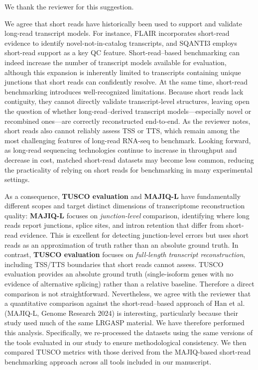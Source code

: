 \documentclass[11pt]{article}
\newcommand{\tuscoEvaluation}{TUSCO evaluation}
\newcommand{\tuscoMetrics}{TUSCO metrics}
\begin{document}
\begin{responseboxnew}

We thank the reviewer for this suggestion.

    \vspace{0.3cm}
 We agree that short reads have historically been used to support and validate long-read transcript models. For instance, FLAIR incorporates short-read evidence to identify novel-not-in-catalog transcripts, and SQANTI3 employs short-read support as a key QC feature. Short-read--based benchmarking can indeed increase the number of transcript models available for evaluation, although this expansion is inherently limited to transcripts containing unique junctions that short reads can confidently resolve.
At the same time, short-read benchmarking introduces well-recognized limitations. Because short reads lack contiguity, they cannot directly validate transcript-level structures, leaving open the question of whether long-read--derived transcript models---especially novel or recombined ones---are correctly reconstructed end-to-end. As the reviewer notes, short reads also cannot reliably assess TSS or TTS, which remain among the most challenging features of long-read RNA-seq to benchmark. Looking forward, as long-read sequencing technologies continue to increase in throughput and decrease in cost, matched short-read datasets may become less common, reducing the practicality of relying on short reads for benchmarking in many experimental settings.

    \vspace{0.3cm}
    As a consequence, \textbf{\tuscoEvaluation{}} and \textbf{MAJIQ-L} have fundamentally different scopes and target distinct dimensions of transcriptome reconstruction quality: \textbf{MAJIQ-L} focuses on \textit{junction-level} comparison, identifying where long reads report junctions, splice sites, and intron
        retention that differ from short-read evidence. This is excellent for detecting junction-level errors but uses short reads as an approximation of truth rather than an absolute ground truth. In contrast, \textbf{\tuscoEvaluation{}} focuses on \textit{full-length transcript reconstruction}, including TSS/TTS boundaries that short reads cannot assess. \tuscoEvaluation{} provides an absolute ground truth (single-isoform genes with no evidence of alternative splicing) rather than a relative baseline. Therefore a direct comparison is not straightforward.
    Nevertheless, we agree with the reviewer that a quantitative comparison against the short-read--based approach of Han et al. (MAJIQ-L, Genome Research 2024) is interesting, particularly because their study used much of the same LRGASP material. We have therefore performed this analysis. Specifically, we re-processed the datasets using the same versions of the tools evaluated in our study to ensure methodological consistency. We then compared \tuscoMetrics{} with those derived from the MAJIQ-based short-read benchmarking approach across all tools included in our manuscript.


\end{responseboxnew}
\end{document}
